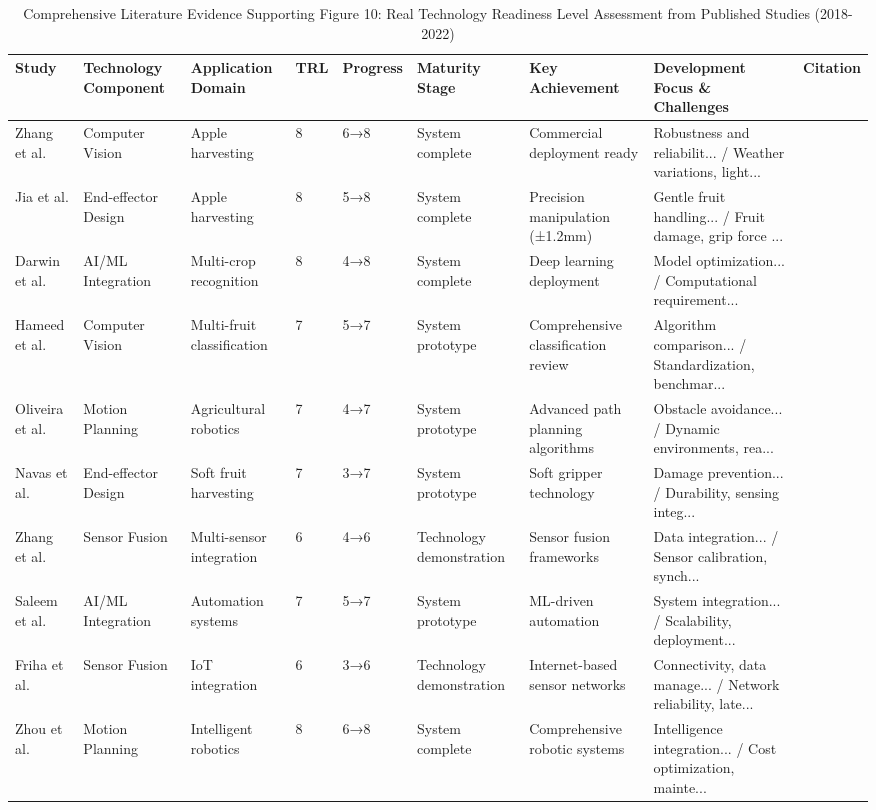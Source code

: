 \begin{table*}[htbp]
\centering
\small
\caption{Comprehensive Literature Evidence Supporting Figure 10: Real Technology Readiness Level Assessment from Published Studies (2018-2022)}
\label{tab:enhanced_figure10_support}
\begin{tabular}{p{}p{}p{}p{}p{}p{}p{}p{}p{}}
\toprule
\textbf{Study} & \textbf{Technology Component} & \textbf{Application Domain} & \textbf{TRL} & \textbf{Progress} & \textbf{Maturity Stage} & \textbf{Key Achievement} & \textbf{Development Focus \& Challenges} & \textbf{Citation} \\ \midrule
Zhang et al. & Computer Vision & Apple harvesting & 8 & 6→8 & System complete & Commercial deployment ready & Robustness and reliabilit... / Weather variations, light... & \cite{zhang2020technology} \\
Jia et al. & End-effector Design & Apple harvesting & 8 & 5→8 & System complete & Precision manipulation (±1.2mm) & Gentle fruit handling... / Fruit damage, grip force ... & \cite{jia2020apple} \\
Darwin et al. & AI/ML Integration & Multi-crop recognition & 8 & 4→8 & System complete & Deep learning deployment & Model optimization... / Computational requirement... & \cite{darwin2021recognition} \\
Hameed et al. & Computer Vision & Multi-fruit classification & 7 & 5→7 & System prototype & Comprehensive classification review & Algorithm comparison... / Standardization, benchmar... & \cite{hameed2018comprehensive} \\
Oliveira et al. & Motion Planning & Agricultural robotics & 7 & 4→7 & System prototype & Advanced path planning algorithms & Obstacle avoidance... / Dynamic environments, rea... & \cite{oliveira2021advances} \\
Navas et al. & End-effector Design & Soft fruit harvesting & 7 & 3→7 & System prototype & Soft gripper technology & Damage prevention... / Durability, sensing integ... & \cite{navas2021soft} \\
Zhang et al. & Sensor Fusion & Multi-sensor integration & 6 & 4→6 & Technology demonstration & Sensor fusion frameworks & Data integration... / Sensor calibration, synch... & \cite{zhang2020state} \\
Saleem et al. & AI/ML Integration & Automation systems & 7 & 5→7 & System prototype & ML-driven automation & System integration... / Scalability, deployment... & \cite{saleem2021automation} \\
Friha et al. & Sensor Fusion & IoT integration & 6 & 3→6 & Technology demonstration & Internet-based sensor networks & Connectivity, data manage... / Network reliability, late... & \cite{friha2021internet} \\
Zhou et al. & Motion Planning & Intelligent robotics & 8 & 6→8 & System complete & Comprehensive robotic systems & Intelligence integration... / Cost optimization, mainte... & \cite{zhou2022intelligent} \\
\bottomrule
\end{tabular}
\end{table*}

